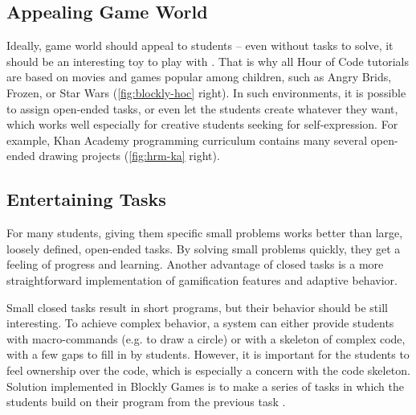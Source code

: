 \subsection{Appealing Game World}
\label{sec:motivation.game-world}
Ideally, game world should appeal to students --
even without tasks to solve,
  it should be an interesting toy to play with \cite{book-of-lenses}.
That is why all Hour of Code tutorials are based on movies and games
  popular among children, such as Angry Brids, Frozen, or Star Wars
  (\cref{fig:blockly-hoc} right).
In such environments, it is possible to assign open-ended tasks,
  or even let the students create whatever they want,
  which works well especially for creative students seeking for self-expression.
For example, Khan Academy programming curriculum contains many several
open-ended drawing projects (\cref{fig:hrm-ka} right).

\subsection{Entertaining Tasks}
\label{sec:motivation.tasks}
For many students, giving them specific small problems works better
  than large, loosely defined, open-ended tasks.
By solving small problems quickly,
  they get a feeling of progress and learning.
Another advantage of closed tasks
  is a more straightforward implementation of gamification features and adaptive behavior.

Small closed tasks result in short programs,
  but their behavior should be still interesting. %
To achieve complex behavior,
  a system can either provide students with macro-commands (e.g. to draw a circle)
  or with a skeleton of complex code, with a few gaps to fill in by students.
However, it is important for the students to feel ownership over the code,
  which is especially a concern with the code skeleton.
Solution implemented in Blockly Games
  is to make a series of tasks in which the students
  build on their program from the previous task
  \cite{blockly-10-things}.




